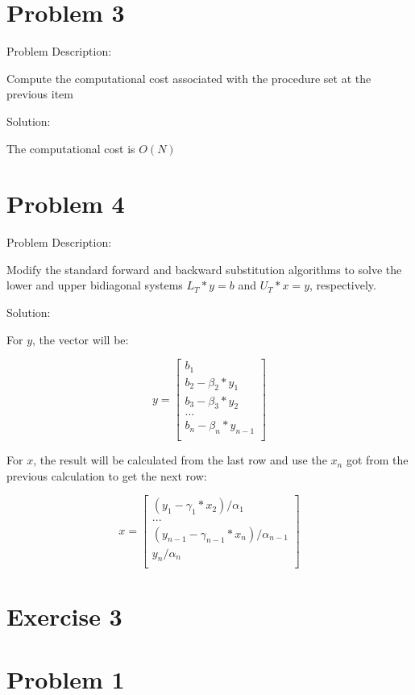 \documentclass[12pt,letter,english]{article}
\begin{document}
\section*{Problem 3}

Problem Description:

Compute the computational cost associated with the procedure set at the previous item

Solution:

The computational cost is $O(N)$

\section*{Problem 4}

Problem Description:

Modify the standard forward and backward substitution algorithms to solve the lower and upper bidiagonal systems $L_T*y=b$ and $U_T*x=y$, respectively.

Solution:

For $y$, the vector will be:

\[
  y=
  \left[ {\begin{array}{c}
   b_1\\
   b_2-\beta_2*y_1\\
   b_3-\beta_3*y_2\\
   ...\\
   b_n-\beta_n*y_{n-1}\\
  \end{array} } \right]
\]

For $x$, the result will be calculated from the last row and use the $x_n$ got from the previous calculation to get the next row:

\[
  x=
  \left[ {\begin{array}{c}
   (y_1-\gamma_1*x_2)/\alpha_1\\
   ...\\
   (y_{n-1} - \gamma_{n-1}*x_n)/\alpha_{n-1}\\
   y_n/\alpha_n\\
  \end{array} } \right]
\]



\section*{Exercise 3}
\section*{Problem 1}
\end{document}
